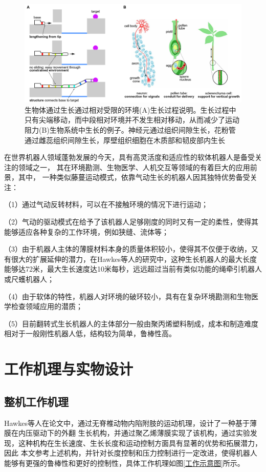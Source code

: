 \documentclass[11pt, a4paper, oneside]{ctexart}
\begin{document}
\begin{figure}[H]
    \centering
    \includegraphics[scale=0.2]{生长过程说明}
    \caption{生物体通过生长通过相对受限的环境\cite{hawkesSoftRobotThat2017a}(A)生长过程说明。生长过程中只有尖端移动，而中段相对环境并不发生相对移动，从而减少了运动阻力(B)生物系统中生长的例子。神经元通过组织间隙生长，花粉管通过雌蕊组织间隙生长，厚壁组织细胞在木质部和韧皮部内生长}
    \label{生长过程说明}
\end{figure}

在世界机器人领域蓬勃发展的今天，具有高灵活度和适应性的软体机器人是备受关注的领域之一，
其在环境勘测、生物医学、人机交互等领域的有着巨大的应用前景，其中，
一种类似藤蔓运动模式，依靠气动生长的机器人因其独特优势备受关注：

（1）通过气动反转材料，可以在不接触环境的情况下进行运动；

（2）气动的驱动模式在给予了该机器人足够刚度的同时又有一定的柔性，使得其能够适应各种复杂的工作环境，例如狭缝、流体等；

（3）由于机器人主体的薄膜材料本身的质量体积较小，使得其不仅便于收纳，又有很大的扩展延伸的潜力，在Hawkes等人的研究中\cite{hawkesSoftRobotThat2017a}，这种生长机器人的最大长度能够达72米，最大生长速度达10米每秒，远远超过当前有类似功能的绳牵引机器人或尺蠖机器人；

（4）由于软体的特性，机器人对环境的破环较小\cite{coadRetractionSoftGrowing2020}，具有在复杂环境勘测和生物医学检查领域应用的潜质；

（5）目前翻转式生长机器人的主体部分一般由聚丙烯塑料制成，成本和制造难度相对于一般刚性机器人低，结构较为简单，鲁棒性高。

\section{工作机理与实物设计}

\subsection{整机工作机理}
Hawkes等人在论文中\cite{hawkesSoftRobotThat2017a}，通过无脊椎动物内陷附肢的运动机理，设计了一种基于薄膜在内压驱动下的外翻
生长机构，并通过聚乙烯薄膜实现了该机构，通过实验发现，这种机构在生长速度、生长长度和运动控制方面具有显著的优势和拓展潜力，因此
本文参考上述机构，并针对长度控制和压力控制进行一定改进，使得机器人能够有更强的鲁棒性和更好的控制性，具体工作机理如图\ref{工作示意图}所示。
\end{document}
